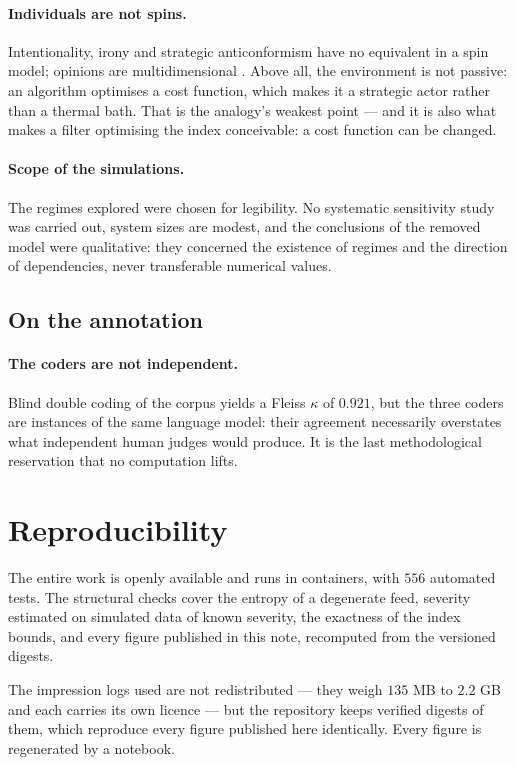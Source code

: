 \documentclass[11pt,a4paper]{article}
\begin{document}
\paragraph{Individuals are not spins.} Intentionality, irony and strategic anticonformism have
no equivalent in a spin model; opinions are multidimensional \citep{deffuant2000}. Above all,
the environment is not passive: an algorithm optimises a cost function, which makes it a
strategic actor rather than a thermal bath. That is the analogy's weakest point --- and it is
also what makes a filter optimising the index conceivable: a cost function can be changed.

\paragraph{Scope of the simulations.} The regimes explored were chosen for legibility. No
systematic sensitivity study was carried out, system sizes are modest, and the conclusions of
the removed model were qualitative: they concerned the existence of regimes and the direction
of dependencies, never transferable numerical values.

\subsection{On the annotation}

\paragraph{The coders are not independent.} Blind double coding of the corpus yields a Fleiss
$\kappa$ of $0.921$, but the three coders are instances of the same language model: their
agreement necessarily overstates what independent human judges would produce. It is the last
methodological reservation that no computation lifts.

\section{Reproducibility}

The entire work is openly available and runs in containers, with $556$ automated tests. The
structural checks cover the entropy of a degenerate feed, severity estimated on simulated
data of known severity, the exactness of the index bounds, and every figure published in
this note, recomputed from the versioned digests.

The impression logs used are not redistributed --- they weigh $135$ MB to $2.2$ GB and each
carries its own licence --- but the repository keeps verified digests of them, which reproduce
every figure published here identically. Every figure is regenerated by a notebook.
\end{document}

